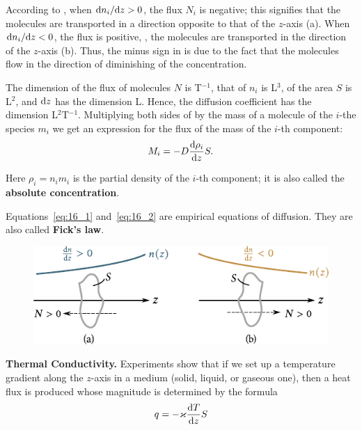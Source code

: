 According to , when $\mathrm{d} n_i/\mathrm{d} z>0$, the flux $N_i$ is negative; this signifies that the molecules are transported in a direction opposite to that of the $z$-axis (a). When $\mathrm{d} n_i/\mathrm{d} z<0$, the flux is positive, \ie, the molecules are transported in the direction of the $z$-axis (b). Thus, the minus sign in  is due to the fact that the molecules flow in the direction of diminishing of the concentration.

The dimension of the flux of molecules $N$ is T$^{-1}$, that of $n_i$ is L$^{3}$, of the area $S$ is L$^{2}$, and $\mathrm{d} z$ has the dimension L. Hence, the diffusion coefficient has the dimension L$^2$T$^{-1}$. Multiplying both sides of  by the mass of a molecule of the $i$-the species $m_i$ we get an expression for the flux of the mass of the $i$-th component:
\begin{equation}\label{eq:16_2}
    M_i = -D \frac{\mathrm{d}\rho_i}{\mathrm{d} z} S.
\end{equation}

\noindent
Here $\rho_i=n_im_i$ is the partial density of the $i$-th component; it is also called the \textbf{absolute concentration}.

Equations~\eqref{eq:16_1} and~\eqref{eq:16_2} are empirical equations of diffusion. They are also called \textbf{Fick's law}.

\begin{figure}[t]
	\begin{center}
		\includegraphics[scale=1]{figures/ch_16/fig_16_2.pdf}
		\caption[]{}
		\label{fig:16_2}
	\end{center}
	\vspace{-0.8cm}
\end{figure}

\textbf{Thermal Conductivity.} Experiments show that if we set up a temperature gradient along the $z$-axis in a medium (solid, liquid, or gaseous one), then a heat flux is produced whose magnitude is determined by the formula
\begin{equation}\label{eq:16_3}
    q = -\varkappa \frac{\mathrm{d} T}{\mathrm{d} z} S
\end{equation}

